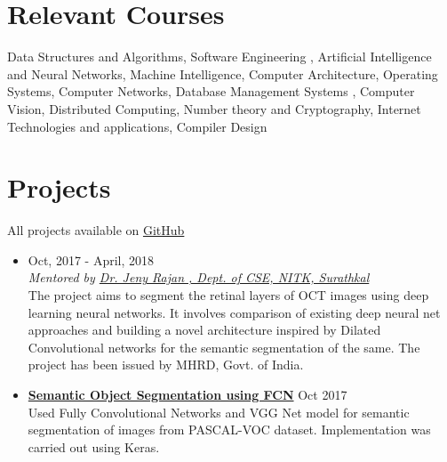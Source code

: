 \documentclass[margin, centered]{res}
\begin{document}
\begin{resume}
\section{Relevant \hspace{2mm} Courses}
Data Structures and Algorithms, Software Engineering , Artificial Intelligence and Neural Networks, Machine Intelligence, Computer Architecture, Operating Systems, Computer Networks, Database Management Systems , Computer Vision, Distributed Computing, Number theory and Cryptography, Internet Technologies and applications, Compiler Design

\section{Projects}
All projects available on \href{https://github.com/PrajwalaTM}{GitHub}
\begin{itemize}[leftmargin=*]
\item \textbf{\color{blue}{Retinal Layer Segmentation using Deep Neural Networks}} \hfill Oct, 2017 - April, 2018\\
\emph{Mentored by \href{http://cse.nitk.ac.in/faculty/jeny-rajan}{Dr. Jeny Rajan , Dept. of CSE, NITK, Surathkal}}\\
The project aims to segment the retinal layers of OCT images using deep learning neural networks. It involves comparison of existing deep neural net approaches and building a novel architecture inspired by Dilated Convolutional networks for the semantic segmentation of the same. The project has been issued by MHRD, Govt. of India. 
\item \textbf{\href{https://github.com/PrajwalaTM/FCN-based-Semantic-Image-Segmentation}{Semantic Object Segmentation using FCN}} \hfill Oct 2017\\
Used Fully Convolutional Networks and VGG Net model for semantic segmentation of images from PASCAL-VOC dataset. Implementation was carried out using Keras.


\end{itemize}
\end{resume}
\end{document}
